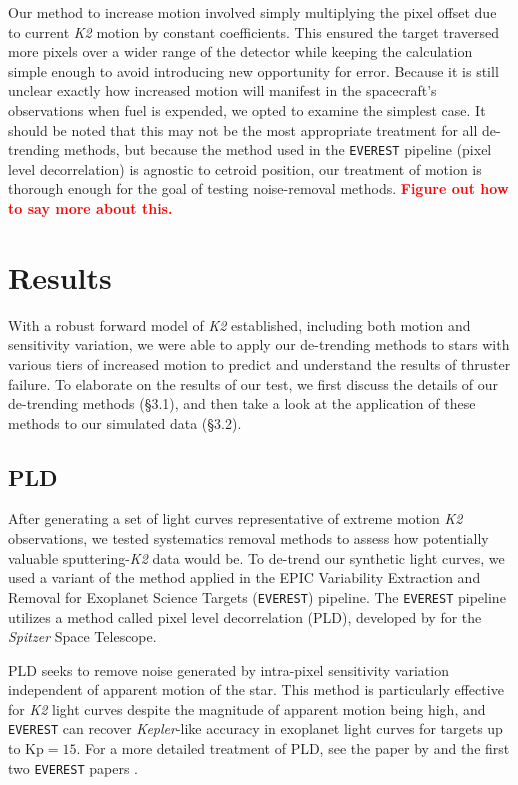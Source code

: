 \documentclass[12pt,preprint]{aastex}
\begin{document}
Our method to increase motion involved simply multiplying the pixel offset due to current \textit{K2} motion by constant coefficients. This ensured the target traversed more pixels over a wider range of the detector while keeping the calculation simple enough to avoid introducing new opportunity for error. Because it is still unclear exactly how increased motion will manifest in the spacecraft's observations when fuel is expended, we opted to examine the simplest case. It should be noted that this may not be the most appropriate treatment for all de-trending methods, but because the method used in the \texttt{EVEREST} pipeline (pixel level decorrelation) is agnostic to cetroid position, our treatment of motion is thorough enough for the goal of testing noise-removal methods. \textcolor{red}{\textbf{Figure out how to say more about this.}}

\section{Results}

With a robust forward model of \textit{K2} established, including both motion and sensitivity variation, we were able to apply our de-trending methods to stars with various tiers of increased motion to predict and understand the results of thruster failure. To elaborate on the results of our test, we first discuss the details of our de-trending methods (\S 3.1), and then take a look at the application of these methods to our simulated data (\S 3.2).

\subsection{PLD}

After generating a set of light curves representative of extreme motion \textit{K2} observations, we tested systematics removal methods to assess how potentially valuable sputtering-\textit{K2} data would be. To de-trend our synthetic light curves, we used a variant of the method applied in the EPIC Variability Extraction and Removal for Exoplanet Science Targets (\texttt{EVEREST}) pipeline. The \texttt{EVEREST} pipeline utilizes a method called pixel level decorrelation (PLD), developed by \cite{0004-637X-805-2-132} for the \textit{Spitzer} Space Telescope.

PLD seeks to remove noise generated by intra-pixel sensitivity variation independent of apparent motion of the star. This method is particularly effective for \textit{K2} light curves despite the magnitude of apparent motion being high, and \texttt{EVEREST} can recover \textit{Kepler}-like accuracy in exoplanet light curves for targets up to $\text{Kp} = 15$. For a more detailed treatment of PLD, see the paper by \cite{0004-637X-805-2-132} and the first two \texttt{EVEREST} papers \citep{2016AJ....152..100L,2017arXiv170205488L}.
\end{document}
